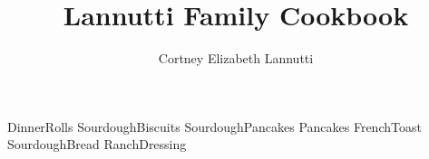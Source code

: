 \documentclass[a4paper]{article}
\title{Lannutti Family Cookbook}
\author{Cortney Elizabeth Lannutti}
\date{}
\begin{document}
\maketitle

{DinnerRolls}
{SourdoughBiscuits}
{SourdoughPancakes}
{Pancakes}
{FrenchToast}
{SourdoughBread}
{RanchDressing}
\end{document}
